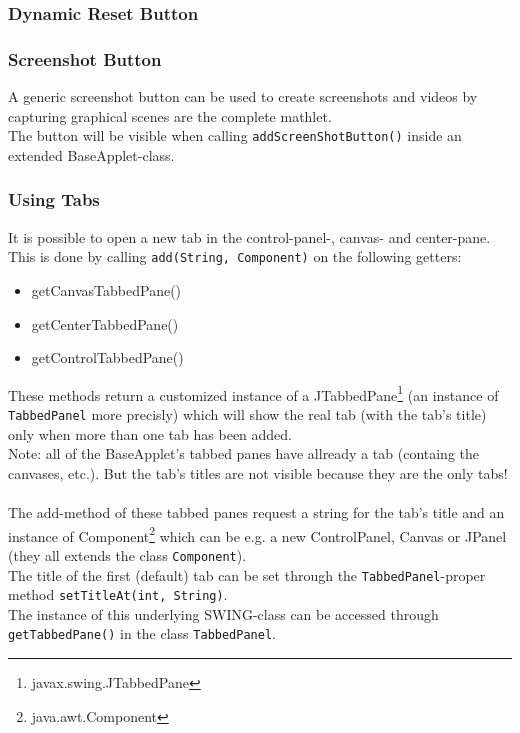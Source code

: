   \subsubsection{Dynamic Reset Button}
  
  \subsubsection{Screenshot Button}
  A generic screenshot button can be used to create screenshots and videos by capturing
  graphical scenes are the complete mathlet.\\
	The button will be visible when calling \verb|addScreenShotButton()| inside an
	extended BaseApplet-class.

  \subsubsection{Using Tabs}
    It is possible to open a new tab in the control-panel-, canvas- and center-pane.
    This is done by calling \verb|add(String, Component)| on the following getters:
    \begin{itemize}
      \item getCanvasTabbedPane()
      \item getCenterTabbedPane()
      \item getControlTabbedPane()
    \end{itemize}
  These methods return a customized instance of a JTabbedPane\footnote{javax.swing.JTabbedPane}
  (an instance of \verb|TabbedPanel| more precisly) which will show the real tab
  (with the tab's title) only when more than one tab has been added.\\
  Note: all of the BaseApplet's tabbed panes have allready a tab (containg the canvases, etc.).
  But the tab's titles are not visible because they are the only tabs!\\\\
  The add-method of these tabbed panes request a string for the tab's title and an
  instance of Component\footnote{java.awt.Component} which can be e.g. a new 
  ControlPanel, Canvas or JPanel (they all extends the class \verb|Component|).\\
  The title of the first (default) tab can be set through the \verb|TabbedPanel|-proper
  method \verb|setTitleAt(int, String)|.\\
  The instance of this underlying SWING-class
  can be accessed through \verb|getTabbedPane()| in the class \verb|TabbedPanel|.
  
